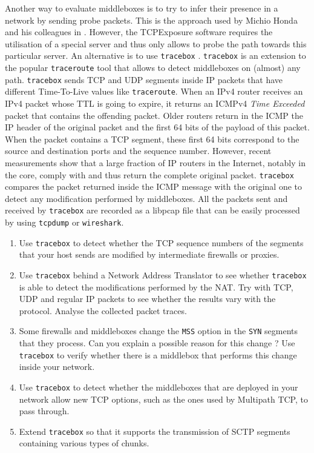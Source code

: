 Another way to evaluate middleboxes is to try to infer their presence in a network by sending probe packets. This is the approach used by Michio Honda and his colleagues in \cite{honda2011still}. However, the TCPExposure software requires the utilisation of a special server and thus only allows to probe the path towards this particular server. An alternative is to use \texttt{tracebox} \cite{Detal_Tracebox:2013}. \texttt{tracebox} is an extension to the popular \texttt{traceroute} tool that allows to detect middleboxes on (almost) any path. \texttt{tracebox} sends TCP and UDP segments inside IP packets that have different Time-To-Live values like \texttt{traceroute}. When an IPv4 router receives an IPv4 packet whose TTL is going to expire, it returns an ICMPv4 \emph{Time Exceeded} packet that contains the offending packet. Older routers return in the ICMP the IP header of the original packet and the first 64 bits of the payload of this packet. When the packet contains a TCP segment, these first 64 bits correspond to the source and destination ports and the sequence number. However, recent measurements show that a large fraction of IP routers in the Internet, notably in the core, comply with \cite{rfc1812} and thus return the complete original packet. \texttt{tracebox} compares the packet returned inside the ICMP message with the original one to detect any modification performed by middleboxes. All the packets sent and received by \texttt{tracebox} are recorded as a libpcap file that can be easily processed by using \texttt{tcpdump} or \texttt{wireshark}.


\begin{enumerate}

\item Use \texttt{tracebox} to detect whether the TCP sequence numbers of the segments that your host sends are modified by intermediate firewalls or proxies.

\item Use \texttt{tracebox} behind a Network Address Translator to see whether \texttt{tracebox} is able to detect the modifications performed by the NAT. Try with TCP, UDP and regular IP packets to see whether the results vary with the protocol. Analyse the collected packet traces.

\item Some firewalls and middleboxes change the \texttt{MSS} option in the \texttt{SYN} segments that they process. Can you explain a possible reason for this change ? Use \texttt{tracebox} to verify whether there is a middlebox that performs this change inside your network.

\item Use \texttt{tracebox} to detect whether the middleboxes that are deployed in your network allow new TCP options, such as the ones used by Multipath TCP, to pass through.

\item Extend \texttt{tracebox} so that it supports the transmission of SCTP segments containing various types of chunks.


\end{enumerate}


